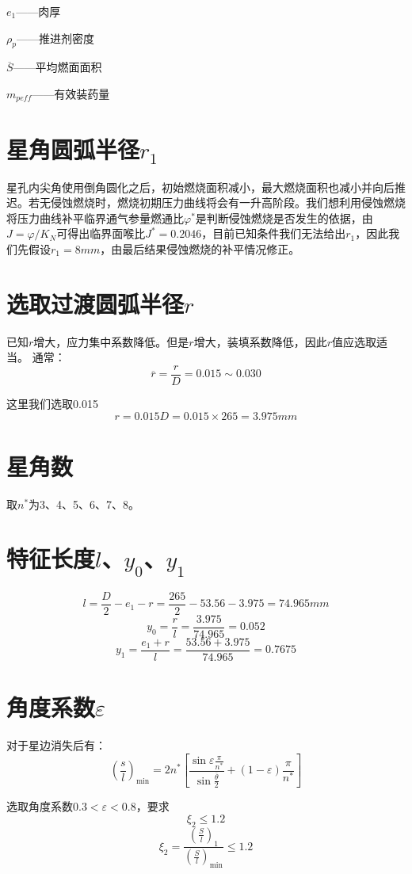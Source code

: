 $e_{1}$——肉厚

$\rho _{p}$——推进剂密度

$\overline{S}$——平均燃面面积

$m_{peff}$——有效装药量

\section{星角圆弧半径$r_{1}$}

星孔内尖角使用倒角圆化之后，初始燃烧面积减小，最大燃烧面积也减小并向后推迟。若无侵蚀燃烧时，燃烧初期压力曲线将会有一升高阶段。我们想利用侵蚀燃烧将压力曲线补平临界通气参量燃通比$\varphi^*$是判断侵蚀燃烧是否发生的依据，由$J=\varphi/K_N$可得出临界面喉比$J^*=0.2046$，目前已知条件我们无法给出$r_{1}$，因此我们先假设$r_{1}=8mm$，由最后结果侵蚀燃烧的补平情况修正。

\section{选取过渡圆弧半径$r$}
已知$r$增大，应力集中系数降低。但是$r$增大，装填系数降低，因此$r$值应选取适当。
通常：
\[
\overline{r}=\frac{r}{D}=0.015\sim 0.030
\]

这里我们选取0.015
\[
  r=0.015D=0.015\times 265=3.975mm
\]

\section{星角数}

取$n^*$为3、4、5、6、7、8。

\section{特征长度$l$、$y_{0}$、$y_{1}$}
\[
l=\frac{D}{2}-e_1-r=\frac{265}{2}-53.56-3.975=74.965mm
\]
\[
y_0=\frac{r}{l}=\frac{3.975}{74.965}=0.052
\]
\[
y_1=\frac{e_1+r}{l}=\frac{53.56+3.975}{74.965}=0.7675
\]

\section{角度系数\texorpdfstring{$\varepsilon $}{}}

对于星边消失后有：
\[
\left( \frac{s}{l} \right) _{\min}=2n^*\left[ \frac{\sin \varepsilon \frac{\pi}{n^*}}{\sin \frac{\overline{\theta }}{2}}+(1-\varepsilon )\frac{\pi}{n^*} \right] 
\]

选取角度系数$0.3< \varepsilon <0.8$，要求
\[
\xi _2\leqslant 1.2
\]
\[
\xi _2=\frac{\left( \frac{S}{l} \right) _1}{\left( \frac{S}{l} \right) _{\min}}\le 1.2
\]

